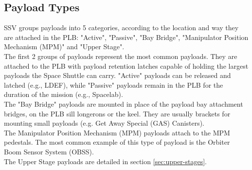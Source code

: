 \documentclass[Space_Shuttle_Vessel_Manual.tex]{subfiles}
\begin{document}
\begin{multicols*}{2}
\subsection{Payload Types}
\noindent
SSV groups payloads into 5 categories, according to the location and way they are attached in the PLB: "Active", "Passive", "Bay Bridge", "Manipulator Position Mechanism (MPM)" and "Upper Stage".
\\
The first 2 groups of payloads represent the most common payloads. They are attached to the PLB with payload retention latches capable of holding the largest payloads the Space Shuttle can carry. "Active" payloads can be released and latched (e.g., LDEF), while "Passive" payloads remain in the PLB for the duration of the mission (e.g., Spacelab).
\\
The "Bay Bridge" payloads are mounted in place of the payload bay attachment bridges, on the PLB sill longerons or the keel. They are usually brackets for mounting small payloads (e.g. Get Away Special (GAS) Canisters).
\\
The Manipulator Position Mechanism (MPM) payloads attach to the MPM pedestals. The most common example of this type of payload is the Orbiter Boom Sensor System (OBSS).
\\
The Upper Stage payloads are detailed in section \ref{sec:upper-stages}.



\end{multicols*}
\end{document}
